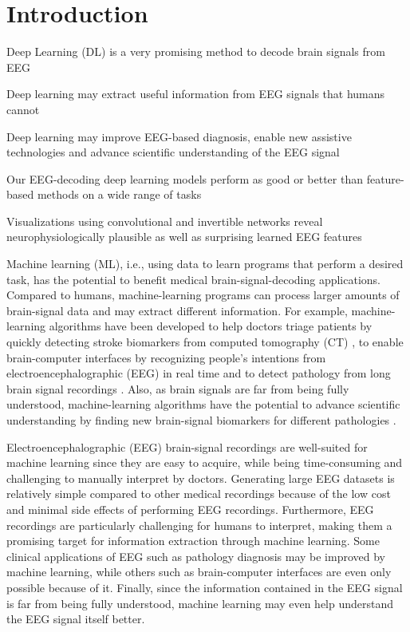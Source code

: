 \chapter{Introduction}\label{introduction}

\begin{startbox}{Deep Learning (DL) is a very promising method to decode brain signals from EEG}
\item Deep learning may extract useful information from EEG signals that humans cannot
\item Deep learning may improve EEG-based diagnosis, enable new assistive technologies and advance scientific understanding of the EEG signal
\item Our EEG-decoding deep learning models perform as good or better than feature-based methods on a wide range of tasks
\item Visualizations using convolutional and invertible networks reveal neurophysiologically plausible as well as surprising learned EEG features
\end{startbox}


Machine learning (ML), i.e., using data to learn programs that perform a
desired task, has the potential to benefit medical brain-signal-decoding
applications. Compared to humans, machine-learning programs can process
larger amounts of brain-signal data and may extract different
information. For example, machine-learning algorithms have been
developed to help doctors triage patients by quickly detecting stroke
biomarkers from computed tomography (CT)
\citep{chavva2022deep}, to enable brain-computer interfaces
by recognizing people's intentions from electroencephalographic (EEG) in
real time \citep{abiri2019comprehensive} and to detect
pathology from long brain signal recordings
\citep{gemein2020machine,schirrmeisterdeeppathology}. Also,
as brain signals are far from being fully understood, machine-learning
algorithms have the potential to advance scientific understanding by
finding new brain-signal biomarkers for different pathologies
\citep{raghu2020survey}.



    Electroencephalographic (EEG) brain-signal recordings are well-suited
for machine learning since they are easy to acquire, while being
time-consuming and challenging to manually interpret by doctors.
Generating large EEG datasets is relatively simple compared to other
medical recordings because of the low cost and minimal side effects of
performing EEG recordings. Furthermore, EEG recordings are particularly
challenging for humans to interpret, making them a promising target for
information extraction through machine learning. Some clinical
applications of EEG such as pathology diagnosis may be improved by
machine learning, while others such as brain-computer interfaces are
even only possible because of it. Finally, since the information
contained in the EEG signal is far from being fully understood, machine
learning may even help understand the EEG signal itself better.

